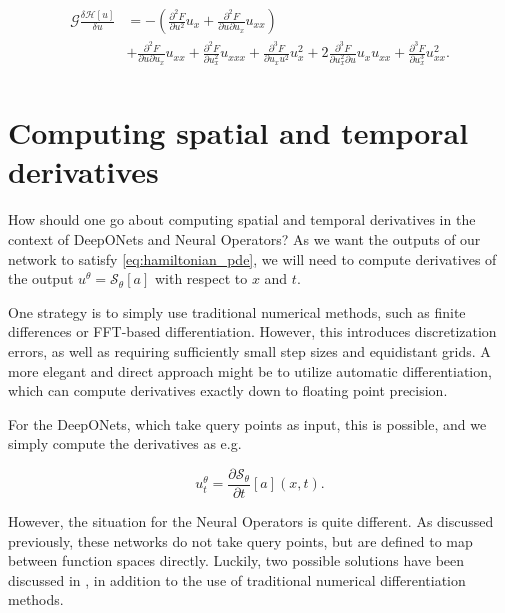 \begin{align}
    \mathcal{G}\frac{\delta \mathcal{H}[u]}{\delta u} &=
    -\left(\frac{\partial^2 F}{\partial u^2} u_x + \frac{\partial^2 F}{\partial u \partial u_x} u_{xx}\right) \nonumber\\
    &+
    \frac{\partial^2 F}{\partial u \partial u_x} u_{xx}
    +\frac{\partial^2 F}{\partial u_x^2} u_{xxx}
    +\frac{\partial^3 F}{\partial u_x u^2} u_x^2
    +2\frac{\partial^3 F}{\partial u_x^2 \partial u} u_x u_{xx}
    +\frac{\partial^3 F}{\partial u_x^3}  u_{xx}^2. \nonumber\\
    \label{eq:hamiltonian_chain_rule}
\end{align}


\section{Computing spatial and temporal derivatives}

How should one go about computing spatial and temporal derivatives in the context of DeepONets and Neural Operators?
As we want the outputs of our network to satisfy \cref{eq:hamiltonian_pde}, we will need to compute
derivatives of the output \(u^\theta = \mathcal{S}_\theta[a]\) with respect to \(x\) and \(t\).

One strategy is to simply use traditional numerical methods, such as finite differences or FFT-based differentiation. 
However, this introduces discretization errors, as well as requiring sufficiently small step sizes and equidistant grids.
A more elegant and direct approach might be to utilize automatic differentiation, which can compute derivatives exactly down to floating point precision.

For the DeepONets, which take query points as input, this is possible, and we simply compute the derivatives as e.g.

\begin{equation}
    u_t^\theta = \frac{\partial \mathcal{S}_\theta}{\partial t}[a](x,t).
    \label{eq:temporal_derivative_DON}
\end{equation}

However, the situation for the Neural Operators is quite different. As discussed previously, these networks do not take query points, but 
are defined to map between function spaces directly.
Luckily, two possible solutions have been discussed in , in addition to 
the use of traditional numerical differentiation methods. 

